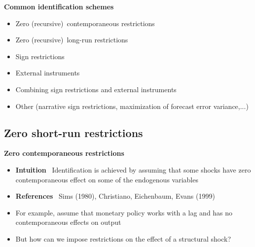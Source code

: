\begin{frame}
{\textbf{Common identification schemes}}\bigskip \bigskip

\begin{itemize}
\item Zero (recursive)\ contemporaneous restrictions\bigskip

\item Zero (recursive)\ long-run restrictions\bigskip

\item Sign restrictions\bigskip

\item External instruments\bigskip

\item Combining sign restrictions and external instruments\bigskip

\item Other (narrative sign restrictions, maximization of forecast error
variance,...)
\end{itemize}
\end{frame}


\subsection{Zero short-run restrictions}

\begin{frame}
\vspace{3cm} \color{title}\bigskip

\color{note}
\end{frame}


\begin{frame}
{\textbf{Zero contemporaneous restrictions}}\bigskip \medskip

\begin{itemize}
\item \textbf{Intuition} \ Identification is achieved by assuming that some
shocks have zero contemporaneous effect on some of the endogenous variables
\bigskip\medskip

\item \textbf{References} \ Sims (1980), Christiano, Eichenbaum, Evans
(1999)\bigskip \medskip \pause

\item For example, assume that monetary policy works with a lag and has no
contemporaneous effects on output\bigskip \medskip \pause

\item But how can we impose restrictions on the effect of a structural shock?
\end{itemize}
\end{frame}

